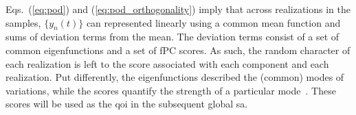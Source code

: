 Eqs.~(\ref{eq:pod}) and (\ref{eq:pod_orthogonality}) imply that across realizations in the samples, 
$\{y_n(t)\}$ can represented linearly using a common mean function and sums of deviation terms from the mean.
The deviation terms consist of a set of common eigenfunctions and a set of fPC scores.
As such, the random character of each realization is left to the score associated with each component and each realization.
Put differently, the eigenfunctions described the (common) modes of variations, 
while the scores quantify the strength of a particular mode~\cite{Wang2012}.
These scores will be used as the \gls{qoi} in the subsequent global \gls{sa}. 